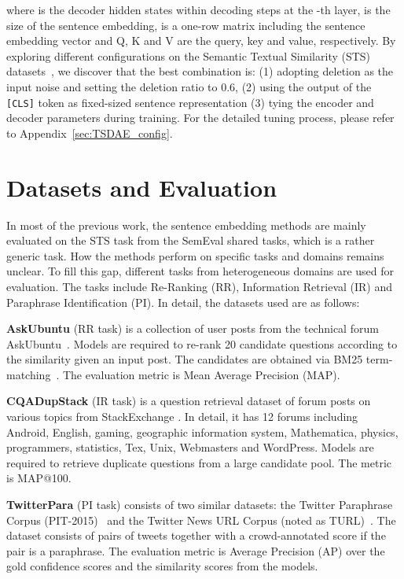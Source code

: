 \documentclass[11pt,a4paper]{article}
\begin{document}
where  is the decoder hidden states within  decoding steps at the -th layer,  is the size of the sentence embedding,  is a one-row matrix including the sentence embedding vector and Q, K and V are the query, key and value, respectively. 
By exploring different configurations on the Semantic Textual Similarity (STS) datasets~\citep{cer-etal-2017-semeval}, we discover that the best combination is: (1) adopting deletion as the input noise and setting the deletion ratio to 0.6, (2) using the output of the \texttt{[CLS]} token as fixed-sized sentence representation (3) tying the encoder and decoder parameters during training. For the detailed tuning process, please refer to Appendix~\ref{sec:TSDAE_config}.


\section{Datasets and Evaluation}
In most of the previous work, the sentence embedding methods are mainly evaluated on the STS task from the SemEval shared tasks, which is a rather generic task. How the methods perform on specific tasks and domains remains unclear. To fill this gap, different tasks from heterogeneous domains are used for evaluation. The tasks include Re-Ranking (RR), Information Retrieval (IR) and Paraphrase Identification (PI). In detail, the datasets used are as follows:

\textbf{AskUbuntu} (RR task) is a collection of user posts from the technical forum AskUbuntu~\citep{DBLP:conf/naacl/LeiJBJTMM16}. Models are required to re-rank 20 candidate questions according to the similarity given an input post. The candidates are obtained via BM25 term-matching~\citep{DBLP:conf/trec/RobertsonWJHG94}. The evaluation metric is Mean Average Precision (MAP).

\textbf{CQADupStack} (IR task) is a question retrieval dataset of forum posts on various topics from StackExchange \citep{DBLP:conf/adcs/HoogeveenVB15}. In detail, it has 12 forums including Android, English, gaming, geographic information system, Mathematica, physics, programmers, statistics, Tex, Unix, Webmasters and WordPress. Models are required to retrieve duplicate questions from a large candidate pool. The metric is MAP@100.

\textbf{TwitterPara} (PI task) consists of two similar datasets: the Twitter Paraphrase Corpus (PIT-2015)~\citep{DBLP:conf/semeval/XuCD15} and the Twitter News URL Corpus (noted as TURL)~\citep{DBLP:conf/emnlp/LanQHX17}. The dataset consists of pairs of tweets together with a crowd-annotated score if the pair is a paraphrase. The evaluation metric is Average Precision (AP) over the gold confidence scores and the similarity scores from the models.
\end{document}
